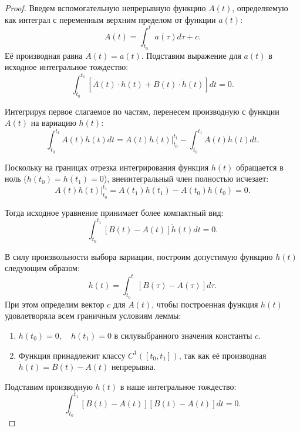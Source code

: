 \begin{proof}
Введем вспомогательную непрерывную функцию $A(t)$, определяемую как интеграл с переменным верхним пределом от функции $a(t)$:
\begin{equation}
    A(t) = \int_{t_0}^t a(\tau) d\tau + c.
\end{equation}
Её производная равна $\dot{A}(t) = a(t)$. Подставим выражение для $a(t)$ в исходное интегральное тождество:
\begin{equation}
    \int_{t_0}^{t_1} \left[ \dot{A}(t) \cdot h(t) + B(t) \cdot \dot{h}(t) \right] dt = 0.
\end{equation}

Интегрируя первое слагаемое по частям, перенесем производную с функции $A(t)$ на вариацию $h(t)$:
\begin{equation}
    \int_{t_0}^{t_1} \dot{A}(t) h(t) dt = \left. A(t)h(t) \right|_{t_0}^{t_1} - \int_{t_0}^{t_1} A(t) \dot{h}(t) dt.
\end{equation}

Поскольку на границах отрезка интегрирования функция $h(t)$ обращается в ноль ($h(t_0) = h(t_1) = 0$), внеинтегральный член полностью исчезает:
\begin{equation}
    \left. A(t)h(t) \right|_{t_0}^{t_1} = A(t_1)h(t_1) - A(t_0)h(t_0) = 0.
\end{equation}

Тогда исходное уравнение принимает более компактный вид:
\begin{equation}
    \int_{t_0}^{t_1} \left[ B(t) - A(t) \right] \dot{h}(t) dt = 0.
\end{equation}


В силу произвольности выбора вариации, построим допустимую функцию $h(t)$ следующим образом:
\begin{equation}
    h(t) = \int_{t_0}^t \left[ B(\tau) - A(\tau) \right] d\tau.
\end{equation}
При этом определим вектор $c$ для $A(t)$, чтобы 
  построенная функция $h(t)$ удовлетворяла всем граничным условиям леммы:
\begin{enumerate}
    \item $h(t_0) = 0, \quad h(t_1) = 0$ в силувыбранного значения константы $c$.
    \item Функция принадлежит классу $C^1([t_0, t_1])$, так как её производная $\dot{h}(t) = B(t) - A(t)$ непрерывна.
\end{enumerate}

Подставим производную $\dot{h}(t)$ в наше интегральное тождество:
\begin{equation}
    \int_{t_0}^{t_1} \left[ B(t) - A(t) \right] \left[ B(t) - A(t) \right] dt = 0.
\end{equation}


\end{proof}
